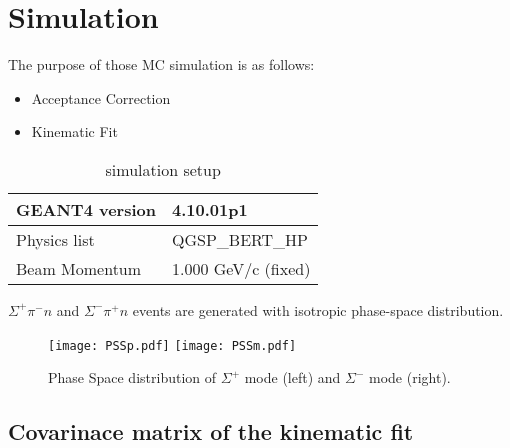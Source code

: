 \section{Simulation}
The purpose of those MC simulation is as follows:
\begin{itemize}
\item Acceptance Correction
\item Kinematic Fit
\end{itemize}

\begin{table}[]
  \centering
  \caption{simulation setup}
  \begin{tabular}{l|l} \hline
  GEANT4 version & 4.10.01p1   \\ \hline\hline
  Physics list  &  QGSP\_BERT\_HP   \\ \hline\hline
  Beam Momentum & 1.000 GeV/c (fixed)  \\ \hline\hline 
  \end{tabular}
\end{table}
$\Sigma^+\pi^- n$ and $\Sigma^-\pi^+ n$ events are generated with isotropic phase-space distribution.

\begin{figure}
\texttt{[image: PSSp.pdf]}
\texttt{[image: PSSm.pdf]}
\caption{Phase Space distribution of $\Sigma^+$ mode (left) and $\Sigma^-$ mode (right).}
\end{figure}




\subsection{Covarinace matrix of the kinematic fit}

